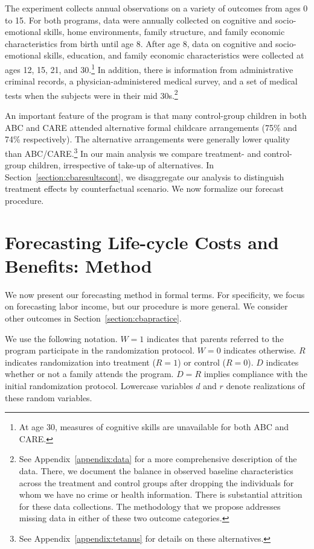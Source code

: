 The experiment collects annual observations on a variety of outcomes from ages 0 to 15. For both programs, data were annually collected on cognitive and socio-emotional skills, home environments, family structure, and family economic characteristics from birth until age 8. After age 8, data on cognitive and socio-emotional skills, education, and family economic characteristics were collected at ages 12, 15, 21, and 30.\footnote{At age 30, measures of cognitive skills are unavailable for both ABC and CARE.} In addition, there is information from administrative criminal records, a physician-administered medical survey, and a set of medical tests when the subjects were in their mid 30s.\footnote{See  Appendix~\ref{appendix:data} for a more comprehensive description of the data. There, we document the balance in observed baseline characteristics across the treatment and control groups after dropping the individuals for whom we have no crime or health information. There is substantial attrition for these data collections. The methodology that we propose addresses missing data in either of these two outcome categories.}

An important feature of the program is that many control-group children in both ABC and CARE attended alternative formal childcare arrangements (75\% and 74\% respectively). The alternative arrangements were generally lower quality than ABC/CARE.\footnote{See Appendix~\ref{appendix:tetanus} for details on these alternatives.} In our main analysis we compare treatment- and control-group children, irrespective of take-up of alternatives. In Section~\ref{section:cbaresultscont}, we disaggregate our analysis to distinguish treatment effects by counterfactual scenario. We now formalize our forecast procedure. 

\section{Forecasting Life-cycle Costs and Benefits: Method} \label{section:cbamethodology}

We now present our forecasting method in formal terms. For specificity, we focus on forecasting labor income, but our procedure is more general. We consider other outcomes in Section~\ref{section:cbapractice}.

We use the following notation. $W=1$ indicates that parents referred to the program participate in the randomization protocol. $W=0$ indicates otherwise. $R$ indicates randomization into treatment ($R = 1$) or control ($R = 0$). $D$ indicates whether or not a family attends the program. $D = R$ implies compliance with the initial randomization protocol. Lowercase variables $d$ and $r$ denote realizations of these random variables.

